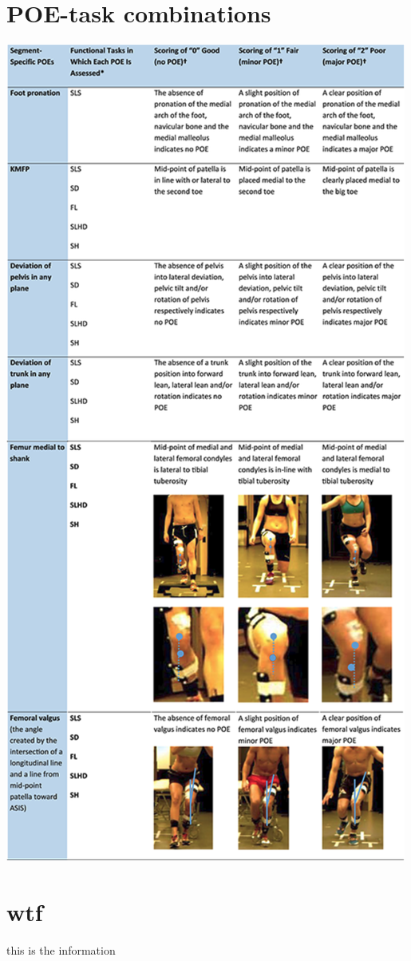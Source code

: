 \appendix


\chapter[POE-task combinations]{POE-task combinations \cite{Nae2020b}} \label{app:poe-task}
  \centering
  \includegraphics[trim=0 60 0 0, clip, height=0.9\textheight]{files/figs/app/poes-detailed-rot.png}


\chapter{wtf}
this is the information
